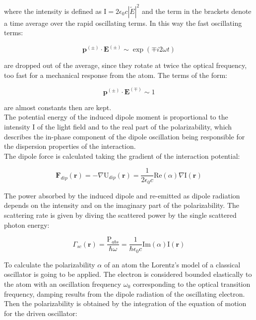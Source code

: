 \documentclass[../thesis.tex]{subfiles}
\begin{document}
where the intensity is defined as $\text{I} = 2 \epsilon_0 c |\tilde{E}|^2$ and the term in the brackets denote a time average over the rapid oscillating terms. In this way the fast oscillating terms:

\begin{equation}
\textbf{p}^{(\pm)} \cdot \textbf{E}^{(\pm)} \sim \exp(\mp i2 \omega t)
\end{equation}

are dropped out of the average, since they rotate at twice the optical frequency, too fast for a mechanical response from the atom. The terms of the form:

\begin{equation}
\textbf{p}^{(\pm)} \cdot \textbf{E}^{(\mp)} \sim 1
\end{equation}

are almost constants then are kept.\\
The potential energy of the induced dipole moment is proportional to the intensity $\text{I}$ of the light field and to the real part of the polarizability, which describes the in-phase component of the dipole oscillation being responsible for the dispersion properties of the interaction.\\
The dipole force is calculated taking the gradient of the interaction potential:

\begin{equation}
\textbf{F}_{dip} (\textbf{r}) = - \nabla \text{U}_{dip} (\textbf{r}) = \frac{1}{2 \epsilon_0 c} \text{Re}(\alpha) \nabla \text{I}(\textbf{r})
\end{equation}

The power absorbed by the induced dipole and re-emitted as dipole radiation depends on the intensity and on the imaginary part of the polarizability. The scattering rate is given by diving the scattered power by the single scattered photon energy:

\begin{equation}
\Gamma_{sc} (\textbf{r}) = \frac{\text{P}_{abs}}{\hbar \omega} = \frac{1}{\hbar \epsilon_0 c} \text{Im}(\alpha) \text{I}(\textbf{r})
\end{equation}

To calculate the polarizability $\alpha$ of an atom the Lorentz's model of a classical oscillator is going to be applied. The electron is considered bounded elastically to the atom with an oscillation frequency $\omega_0$ corresponding to the optical transition frequency, damping results from the dipole radiation of the oscillating electron. Then the polarizability is obtained by the integration of the equation of motion for the driven oscillator:
\end{document}
